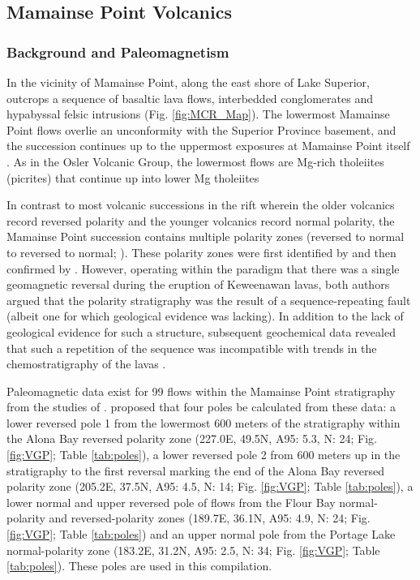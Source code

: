 \documentclass[11pt,letterpaper]{article}
\begin{document}
\subsection{Mamainse Point Volcanics}

\subsubsection{Background and Paleomagnetism}

In the vicinity of Mamainse Point, along the east shore of Lake Superior, outcrops a sequence of basaltic lava flows, interbedded conglomerates and hypabyssal felsic intrusions (Fig. \ref{fig:MCR_Map}). The lowermost Mamainse Point flows overlie an unconformity with the Superior Province basement, and the succession continues up to the uppermost exposures at Mamainse Point itself \citep{Giblin1969d,Swanson-Hysell2014a}. As in the Osler Volcanic Group, the lowermost flows are Mg-rich tholeiites (picrites) that continue up into lower Mg tholeiites \citep{Shirey1997a, Keays2015a}

In contrast to most volcanic successions in the rift wherein the older volcanics record reversed polarity and the younger volcanics record normal polarity, the Mamainse Point succession contains multiple polarity zones (reversed to normal to reversed to normal; \citealp{Swanson-Hysell2009a}). These polarity zones were first identified by \cite{Palmer1970a} and then confirmed by \cite{Robertson1973a}. However, operating within the paradigm that there was a single geomagnetic reversal during the eruption of Keweenawan lavas, both authors argued that the polarity stratigraphy was the result of a sequence-repeating fault (albeit one for which geological evidence was lacking). In addition to the lack of geological evidence for such a structure, subsequent geochemical data revealed that such a repetition of the sequence was incompatible with trends in the chemostratigraphy of the lavas \citep{Klewin1990a, Shirey1994a}.

Paleomagnetic data exist for 99 flows within the Mamainse Point stratigraphy from the studies of \citet{Swanson-Hysell2009a, Swanson-Hysell2014a}. \cite{Swanson-Hysell2014a} proposed that four poles be calculated from these data: a lower reversed pole 1 from the lowermost 600 meters of the stratigraphy within the Alona Bay reversed polarity zone (227.0\textdegree E, 49.5\textdegree N, A95: 5.3\textdegree, N: 24; Fig. \ref{fig:VGP}; Table \ref{tab:poles}), a lower reversed pole 2 from 600 meters up in the stratigraphy to the first reversal marking the end of the Alona Bay reversed polarity zone (205.2\textdegree E, 37.5\textdegree N, A95: 4.5\textdegree, N: 14; Fig. \ref{fig:VGP}; Table \ref{tab:poles}), a lower normal and upper reversed pole of flows from the Flour Bay normal-polarity and reversed-polarity zones (189.7\textdegree E, 36.1\textdegree N, A95: 4.9\textdegree, N: 24; Fig. \ref{fig:VGP}; Table \ref{tab:poles}) and an upper normal pole from the Portage Lake normal-polarity zone (183.2\textdegree E, 31.2\textdegree N, A95: 2.5\textdegree, N: 34; Fig. \ref{fig:VGP}; Table \ref{tab:poles}). These poles are used in this compilation.
\end{document}
